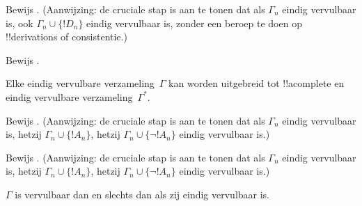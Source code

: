 \documentclass[../../../include/open-logic-section]{subfiles}
\begin{document}
\begin{prob}
Bewijs . (Aanwijzing: de cruciale stap
is aan te tonen dat als $\Gamma_n$ eindig vervulbaar is, ook $\Gamma_n
\cup \{!D_n\}$ eindig vervulbaar is, zonder een beroep te doen op
!!{derivation}s of consistentie.)
\end{prob}
\tagendprob


\begin{prob}
Bewijs .
\end{prob}
\tagendprob

\begin{lem}
 Elke eindig vervulbare verzameling~$\Gamma$
kan worden uitgebreid tot !!a{complete} en eindig vervulbare
verzameling~$\Gamma^*$.
\end{lem}

\begin{prob}
Bewijs . (Aanwijzing: de cruciale
stap is aan te tonen dat als $\Gamma_n$ eindig vervulbaar is, hetzij
$\Gamma_n \cup \{!A_n\}$, hetzij $\Gamma_n \cup \{\lnot !A_n\}$
eindig vervulbaar is.)
\end{prob}
\tagendprob

\begin{prob}
Bewijs . (Aanwijzing: de cruciale
stap is aan te tonen dat als $\Gamma_n$ eindig vervulbaar is, hetzij
$\Gamma_n \cup \{!A_n\}$, hetzij $\Gamma_n \cup \{\lnot !A_n\}$
eindig vervulbaar is.)
\end{prob}
\tagendprob

\begin{thm}[Compactheid]
 $\Gamma$ is vervulbaar dan en slechts
dan als zij eindig vervulbaar is.
\end{thm}
\end{document}
